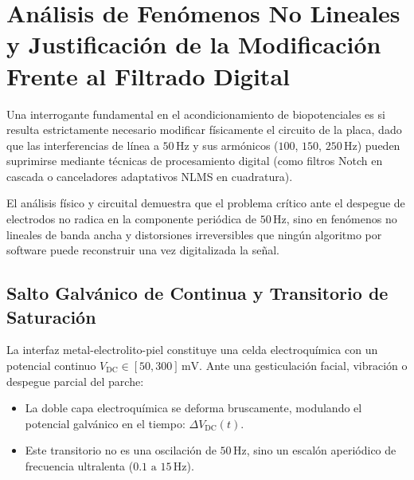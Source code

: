 \documentclass[11pt,a4paper]{article}
\begin{document}
\section{Análisis de Fenómenos No Lineales y Justificación de la Modificación Frente al Filtrado Digital}

Una interrogante fundamental en el acondicionamiento de biopotenciales es si resulta estrictamente necesario modificar físicamente el circuito de la placa, dado que las interferencias de línea a $50\,\text{Hz}$ y sus armónicos ($100$, $150$, $250\,\text{Hz}$) pueden suprimirse mediante técnicas de procesamiento digital (como filtros Notch en cascada o canceladores adaptativos NLMS en cuadratura).

El análisis físico y circuital demuestra que el problema crítico ante el despegue de electrodos no radica en la componente periódica de $50\,\text{Hz}$, sino en fenómenos no lineales de banda ancha y distorsiones irreversibles que ningún algoritmo por software puede reconstruir una vez digitalizada la señal.

\subsection{Salto Galvánico de Continua y Transitorio de Saturación}
La interfaz metal-electrolito-piel constituye una celda electroquímica con un potencial continuo $V_{\text{DC}} \in [50, 300]\,\text{mV}$. Ante una gesticulación facial, vibración o despegue parcial del parche:
\begin{itemize}
    \item La doble capa electroquímica se deforma bruscamente, modulando el potencial galvánico en el tiempo: $\Delta V_{\text{DC}}(t)$.
    \item Este transitorio no es una oscilación de $50\,\text{Hz}$, sino un escalón aperiódico de frecuencia ultralenta ($0.1\text{ a } 15\,\text{Hz}$).
\end{itemize}
\end{document}
